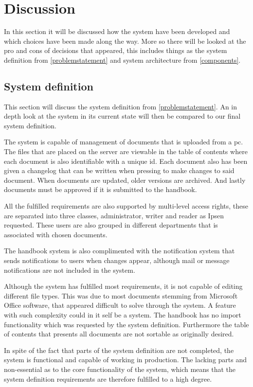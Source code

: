 \chapter{Discussion}
In this section it will be discussed how the system have been developed and which choices have been made along the way. More so there will be looked at the pro and cons of decisions that appeared, this includes things as the system definition from \cref{problemstatement} and system architecture from \cref{components}.

\section{System definition}
This section will discuss the system definition from \cref{problemstatement}. An in depth look at the system in its current state will then be compared to our final system definition.

The system is capable of management of documents that is uploaded from a pc. The files that are placed on the server are viewable in the table of contents where each document is also identifiable with a unique id. Each document also has been given a changelog that can be written when pressing to make changes to said document. When documents are updated, older versions are archived. And lastly documents must be approved if it is submitted to the handbook.

All the fulfilled requirements are also supported by multi-level access rights, these are separated into three classes, administrator, writer and reader as Ipsen requested. These users are also grouped in different departments that is associated with chosen documents.

The handbook system is also complimented with the notification system that sends notifications to users when changes appear, although mail or message notifications are not included in the system.

Although the system has fulfilled most requirements, it is not capable of editing different file types. This was due to most documents stemming from Microsoft Office software, that appeared difficult to solve through the system. A feature with such complexity could in it self be a system. The handbook has no import functionality which was requested by the system definition. Furthermore the table of contents that presents all documents are not sortable as originally desired.

In spite of the fact that parts of the system definition are not completed, the system is functional and capable of working in production. The lacking parts and non-essential as to the core functionality of the system, which means that the system definition requirements are therefore fulfilled to a high degree.

